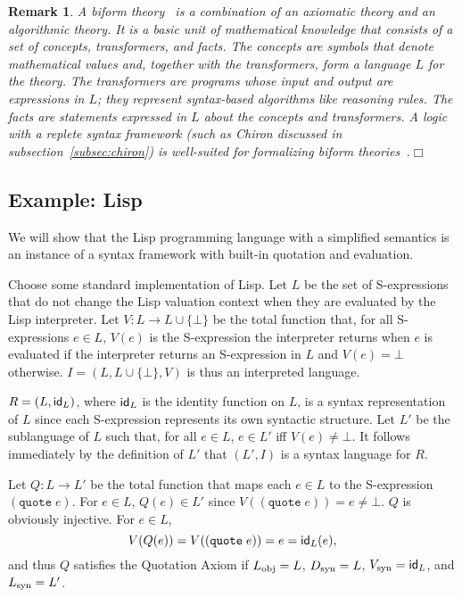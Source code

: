 \documentclass[11pt,fleqn]{article}
\newcommand{\set}[1]{{\{ #1 \}}}
\newcommand{\mname}[1]{\mbox{\sf #1}}
\newcommand{\tarrow}{\rightarrow}
\newtheorem{rem}[thm]{Remark}
\begin{document}
\begin{rem}\em
A \emph{biform
  theory}~\cite{CaretteFarmer08,Farmer07b,FarmerMohrenschildt03} is a
combination of an axiomatic theory and an algorithmic theory.  It is a
basic unit of mathematical knowledge that consists of a set of
\emph{concepts}, \emph{transformers}, and \emph{facts}.  The concepts
are symbols that denote mathematical values and, together with the
transformers, form a language $L$ for the theory.  The transformers
are programs whose input and output are expressions in $L$; they
represent syntax-based algorithms like reasoning rules.  The facts are
statements expressed in $L$ about the concepts and transformers.  A
logic with a replete syntax framework (such as Chiron discussed in
subsection~\ref{subsec:chiron}) is well-suited for formalizing biform
theories~\cite{Farmer07b}.\hfill $\Box$
\end{rem}

\subsection{Example: Lisp} \label{subsec:lisp}

We will show that the Lisp programming language with a simplified
semantics is an instance of a syntax framework with built-in quotation
and evaluation.

Choose some standard implementation of Lisp.  Let $L$ be the set of
S-expressions that do not change the Lisp valuation context when they
are evaluated by the Lisp interpreter.  Let $V : L \tarrow L \cup
\set{\bot}$ be the total function that, for all S-expressions $e \in
L$, $V(e)$ is the S-expression the interpreter returns when $e$ is
evaluated if the interpreter returns an S-expression in $L$ and $V(e)
= \bot$ otherwise.  $I = (L,L \cup \set{\bot},V)$ is thus an
interpreted language.

$R = (L,\mname{id}_L)$, where $\mname{id}_L$ is the identity function
on $L$, is a syntax representation of $L$ since each S-expression
represents its own syntactic structure.  Let $L'$ be the sublanguage
of $L$ such that, for all $e \in L$, $e \in L'$ iff $V(e) \not= \bot$.
It follows immediately by the definition of $L'$ that $(L',I)$ is a
syntax language for $R$.

Let $Q : L \tarrow L'$ be the total function that maps each $e \in L$
to the S-expression $(\texttt{quote} \; e)$.  For $e \in L$, $Q(e) \in
L'$ since $V((\texttt{quote} \; e)) = e \not= \bot$.  $Q$ is obviously
injective.  For $e \in L$, \[V(Q(e)) = V((\texttt{quote} \; e)) = e =
\mname{id}_L(e),\] and thus $Q$ satisfies the Quotation Axiom if
$L_{\rm obj} = L$, $D_{\rm syn} = L$, $V_{\rm syn} = \mname{id}_L$,
and $L_{\rm syn} = L'$.
\end{document}
